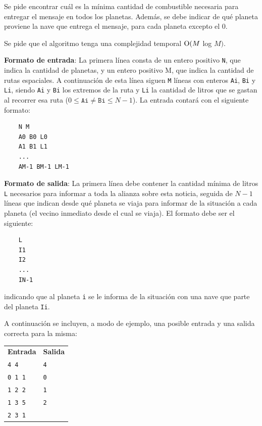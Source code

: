     Se pide encontrar cuál es la mínima cantidad de combustible necesaria para entregar el mensaje en todos los planetas. Además, se debe indicar de qué planeta proviene la nave que entrega el mensaje, para cada planeta excepto el 0.

    Se pide que el algoritmo tenga una complejidad temporal $\operatorname{O}(M$ log $M)$.

    \vspace{1.25em}

    \textbf{Formato de entrada}: La primera línea consta de un entero positivo \texttt{N}, que indica la cantidad de planetas, y un entero positivo M, que indica la cantidad de rutas espaciales. A continuación de esta línea siguen \texttt{M} líneas con enteros \texttt{Ai}, \texttt{Bi} y \texttt{Li}, siendo \texttt{Ai} y \texttt{Bi} los extremos de la ruta y \texttt{Li} la cantidad de litros que se gastan al recorrer esa ruta ($0 \leq \mathtt{Ai} \neq \mathtt{Bi} \leq N-1$). La entrada contará con el siguiente formato:

    \begin{verbatim}
    N M
    A0 B0 L0
    A1 B1 L1
    ...
    AM-1 BM-1 LM-1\end{verbatim}

    \vspace{.8em}

    \textbf{Formato de salida}: La primera línea debe contener la cantidad mínima de litros \texttt{L} necesarios para informar a toda la alianza sobre esta noticia, seguida de $N-1$ líneas que indican desde qué planeta se viaja para informar de la situación a cada planeta (el vecino inmediato desde el cual se viaja). El formato debe ser el siguiente:

    \begin{verbatim}
    L
    I1
    I2
    ...
    IN-1\end{verbatim}

    indicando que al planeta \texttt{i} se le informa de la situación con una nave que parte del planeta \texttt{Ii}.

    \vspace{.8em}

    A continuación se incluyen, a modo de ejemplo, una posible entrada y una
    salida correcta para la misma:

    \vspace{.5em}
    \begin{tabular}{l @{\hskip 4em} l}
    \textbf{Entrada} & \textbf{Salida} \\
    \texttt{4 4}     & \texttt{4}      \\
    \texttt{0 1 1}   & \texttt{0}      \\
    \texttt{1 2 2}   & \texttt{1}      \\
    \texttt{1 3 5}   & \texttt{2}      \\
    \texttt{2 3 1}   &                 \\
    \end{tabular}
    \vspace{.5em}

